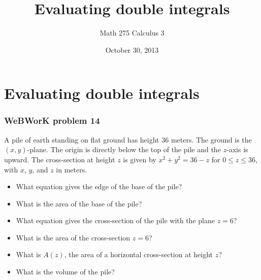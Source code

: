 \documentclass[11pt,ignorenonframetext,aspectratio=169,xcolor={svgnames}]{beamer}
\title{Evaluating double integrals}
\author{Math 275 Calculus 3}
\date{October 30, 2013}
\begin{document}
\frame{\titlepage}

\section{Evaluating double integrals}

\begin{frame}\frametitle{WeBWorK problem 14}

A pile of earth standing on flat ground has height $36$ meters. The
ground is the $(x,y)$-plane. The origin is directly below the top of the
pile and the $z$-axis is upward. The cross-section at height $z$ is
given by $x^2+y^2=36-z$ for $0 \leq z \leq 36$, with $x$, $y$, and $z$
in meters.

\begin{itemize}
\itemsep1pt\parskip0pt
\item
  What equation gives the edge of the base of the pile?
\item
  What is the area of the base of the pile?
\item
  What equation gives the cross-section of the pile with the plane
  $z = 6$?
\item
  What is the area of the cross-section $z = 6$?
\item
  What is $A(z)$, the area of a horizontal cross-section at height $z$?
\item
  What is the volume of the pile?
\end{itemize}

\end{frame}
\end{document}
